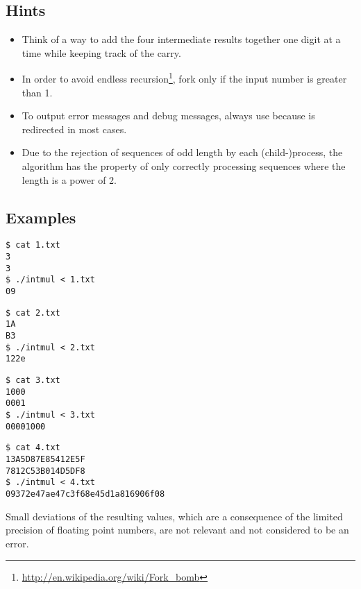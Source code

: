 \clearpage
\subsection*{Hints}

\begin{itemize}
\item Think of a way to add the four intermediate results together
one digit at a time while keeping track of the carry.
\item In order to avoid endless recursion\footnote{\url{http://en.wikipedia.org/wiki/Fork\_bomb}},
fork only if the input number is greater than 1.
\item To output error messages and debug messages, always use
 because  is redirected in most cases.
\item Due to the rejection of sequences of odd length by each (child-)process,
the algorithm has the property of only correctly processing sequences
where the length is a power of 2.
\end{itemize}


\subsection*{Examples}
\begin{multicols}{2}
\begin{verbatim}
$ cat 1.txt
3
3
$ ./intmul < 1.txt
09
\end{verbatim}

\begin{verbatim}
$ cat 2.txt
1A
B3
$ ./intmul < 2.txt
122e
\end{verbatim}

\begin{verbatim}
$ cat 3.txt
1000
0001
$ ./intmul < 3.txt
00001000
\end{verbatim}

\begin{verbatim}
$ cat 4.txt
13A5D87E85412E5F
7812C53B014D5DF8
$ ./intmul < 4.txt
09372e47ae47c3f68e45d1a816906f08
\end{verbatim}
\end{multicols}

Small deviations of the resulting values,
which are a consequence of the limited precision of floating point numbers,
are not relevant and not considered to be an error.



\osueguidelinestwo


